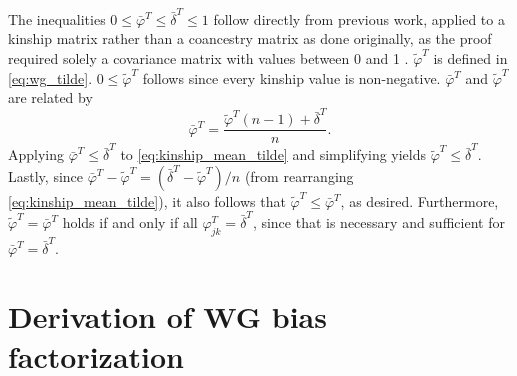 \documentclass[9pt,twocolumn,twoside]{gsajnl}
\newcommand{\kt}[1][k]{\varphi_{j#1}^T}
\begin{document}
\begin{appendices}
  The inequalities $0 \le \bar{\varphi}^T \le \bar{\delta}^T \le 1$ follow directly from previous work, applied to a kinship matrix rather than a coancestry matrix as done originally, as the proof required solely a covariance matrix with values between 0 and 1 \citep{ochoa_estimating_2021}.
  $\tilde{\varphi}^T$ is defined in \cref{eq:wg_tilde}.
  $0 \le \tilde{\varphi}^T$ follows since every kinship value is non-negative.
  $\bar{\varphi}^T$ and $\tilde{\varphi}^T$ are related by
  \begin{equation}
    \label{eq:kinship_mean_tilde}
    \bar{\varphi}^T
    =
    \frac{ \tilde{\varphi}^T (n-1) + \bar{\delta}^T }{n}.
  \end{equation}
  Applying $\bar{\varphi}^T \le \bar{\delta}^T$ to \cref{eq:kinship_mean_tilde} and simplifying yields $\tilde{\varphi}^T \le \bar{\delta}^T$.
  Lastly, since $\bar{\varphi}^T - \tilde{\varphi}^T = \left( \bar{\delta}^T - \tilde{\varphi}^T \right) / n$ (from rearranging \cref{eq:kinship_mean_tilde}), it also follows that $\tilde{\varphi}^T \le \bar{\varphi}^T$, as desired.
  Furthermore, $\tilde{\varphi}^T = \bar{\varphi}^T$ holds if and only if all $\kt = \bar{\delta}^T$, since that is necessary and sufficient for $\bar{\varphi}^T = \bar{\delta}^T$.

  \section{Derivation of WG bias factorization}
  
  \label{sec:wg_biasfunc}


\end{appendices}
\end{document}
